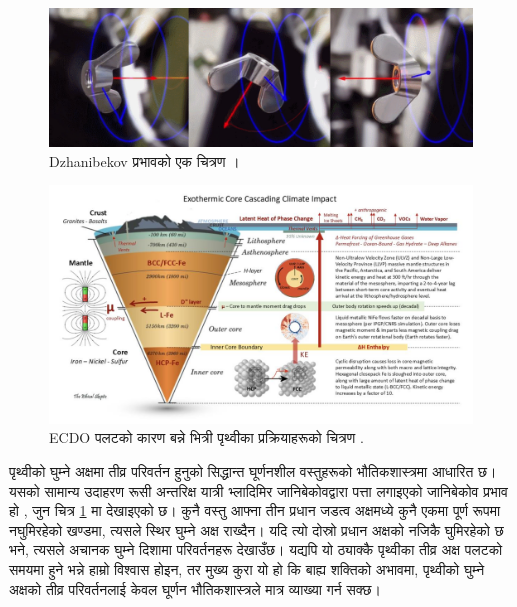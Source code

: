 \documentclass[10pt,twocolumn,letterpaper]{article}
\begin{document}
\begin{figure}[b]

\begin{center}
\includegraphics[width=1\textwidth]{dzhani.jpg}
\end{center}
   \caption{Dzhanibekov प्रभावको एक चित्रण \cite{28}।}
\label{fig:10}
\end{figure}

\begin{figure}[b]
\begin{center}
\includegraphics[width=1\textwidth]{layers.jpg}
\end{center}
   \caption{ECDO पलटको कारण बन्ने भित्री पृथ्वीका प्रक्रियाहरूको चित्रण \cite{129}.}
\label{fig:11}
\end{figure}

पृथ्वीको घुम्ने अक्षमा तीव्र परिवर्तन हुनुको सिद्धान्त घूर्णनशील वस्तुहरूको भौतिकशास्त्रमा आधारित छ। यसको सामान्य उदाहरण रूसी अन्तरिक्ष यात्री भ्लादिमिर जानिबेकोवद्वारा पत्ता लगाइएको जानिबेकोव प्रभाव हो \cite{37}, जुन चित्र \ref{fig:10} मा देखाइएको छ। कुनै वस्तु आफ्ना तीन प्रधान जडत्व अक्षमध्ये कुनै एकमा पूर्ण रूपमा नघुमिरहेको खण्डमा, त्यसले स्थिर घुम्ने अक्ष राख्दैन। यदि त्यो दोस्रो प्रधान अक्षको नजिकै घुमिरहेको छ भने, त्यसले अचानक घुम्ने दिशामा परिवर्तनहरू देखाउँछ। यद्यपि यो ठ्याक्कै पृथ्वीका तीव्र अक्ष पलटको समयमा हुने भन्ने हाम्रो विश्वास होइन, तर मुख्य कुरा यो हो कि बाह्य शक्तिको अभावमा, पृथ्वीको घुम्ने अक्षको तीव्र परिवर्तनलाई केवल घूर्णन भौतिकशास्त्रले मात्र व्याख्या गर्न सक्छ।
\end{document}
